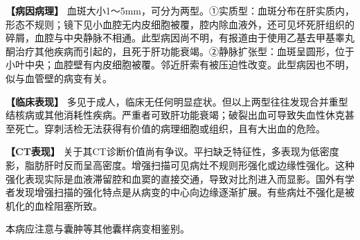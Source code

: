 \textbf{【病因病理】}
血斑大小1～5mm，可分为两型。①实质型：血斑分布在肝实质内，形态不规则；镜下见小血腔无内皮细胞被覆，腔内除血液外，还可见坏死肝组织的碎屑，血腔与中央静脉不相通。此型病因尚不明，有报道由于使用乙基去甲基睾丸酮治疗其他疾病而引起的，且死于肝功能衰竭。②静脉扩张型：血斑呈圆形，位于小叶中央；血腔壁有内皮细胞被覆。邻近肝索有被压迫性改变。此型病因也不明，似与血管壁的病变有关。

\textbf{【临床表现】}
多见于成人，临床无任何明显症状。但以上两型往往发现合并重型结核病或其他消耗性疾病。严重者可致肝功能衰竭；破裂出血可导致失血性休克甚至死亡。穿刺活检无法获得有价值的病理细胞或组织，且有大出血的危险。

\textbf{【CT表现】}
关于其CT诊断价值尚有争议。平扫缺乏特征性，多表现为低密度影，脂肪肝时反而呈高密度。增强扫描可见病灶不规则形强化或边缘性强化。这种强化表现实际是血液滞留腔和血窦的直接交通，导致对比剂进入而显影。国外有学者发现增强扫描的强化特点是从病变的中心向边缘逐渐扩展。有些病灶不强化是被机化的血栓阻塞所致。

本病应注意与囊肿等其他囊样病变相鉴别。

\protect\hypertarget{text00019.html}{}{}

